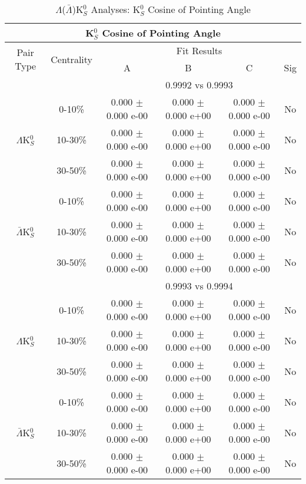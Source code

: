 \documentclass[../AnalysisNoteJBuxton.tex]{subfiles}
\begin{document}
\begin{table}
 \centering
 \begin{tabular}{|c|c|c|c|c|c|}
  \multicolumn{6}{c}{K$^{0}_{S}$ Cosine of Pointing Angle} \\
  \hline
  \multirow{2}{*}{Pair Type} & \multirow{2}{*}{Centrality} & \multicolumn{4}{c|}{Fit Results} \\
  \cline{3-6}
   & & A & B & C & Sig \\  
  \hline
  \multicolumn{2}{|c}{} & \multicolumn{4}{c|}{0.9992 vs 0.9993} \\  
  \hline  
  \multirow{3}{*}{$\Lambda$K$^{0}_{S}$}
   &  0-10\% & 0.000 $\pm$ 0.000 e-00 & 0.000 $\pm$ 0.000 e+00 & 0.000 $\pm$ 0.000 e-00 & No \\
   & 10-30\% & 0.000 $\pm$ 0.000 e-00 & 0.000 $\pm$ 0.000 e+00 & 0.000 $\pm$ 0.000 e-00 & No \\
   & 30-50\% & 0.000 $\pm$ 0.000 e-00 & 0.000 $\pm$ 0.000 e+00 & 0.000 $\pm$ 0.000 e-00 & No \\
  \hline
  \multirow{3}{*}{$\bar{\Lambda}$K$^{0}_{S}$}  
   &  0-10\% & 0.000 $\pm$ 0.000 e-00 & 0.000 $\pm$ 0.000 e+00 & 0.000 $\pm$ 0.000 e-00 & No \\
   & 10-30\% & 0.000 $\pm$ 0.000 e-00 & 0.000 $\pm$ 0.000 e+00 & 0.000 $\pm$ 0.000 e-00 & No \\
   & 30-50\% & 0.000 $\pm$ 0.000 e-00 & 0.000 $\pm$ 0.000 e+00 & 0.000 $\pm$ 0.000 e-00 & No \\
  \hline 
  \multicolumn{2}{|c}{} & \multicolumn{4}{c|}{0.9993 vs 0.9994} \\
  \hline  
  \multirow{3}{*}{$\Lambda$K$^{0}_{S}$}   
   &  0-10\% & 0.000 $\pm$ 0.000 e-00 & 0.000 $\pm$ 0.000 e+00 & 0.000 $\pm$ 0.000 e-00 & No \\
   & 10-30\% & 0.000 $\pm$ 0.000 e-00 & 0.000 $\pm$ 0.000 e+00 & 0.000 $\pm$ 0.000 e-00 & No \\
   & 30-50\% & 0.000 $\pm$ 0.000 e-00 & 0.000 $\pm$ 0.000 e+00 & 0.000 $\pm$ 0.000 e-00 & No \\
  \hline  
  \multirow{3}{*}{$\bar{\Lambda}$K$^{0}_{S}$}
   &  0-10\% & 0.000 $\pm$ 0.000 e-00 & 0.000 $\pm$ 0.000 e+00 & 0.000 $\pm$ 0.000 e-00 & No \\
   & 10-30\% & 0.000 $\pm$ 0.000 e-00 & 0.000 $\pm$ 0.000 e+00 & 0.000 $\pm$ 0.000 e-00 & No \\
   & 30-50\% & 0.000 $\pm$ 0.000 e-00 & 0.000 $\pm$ 0.000 e+00 & 0.000 $\pm$ 0.000 e-00 & No \\
  \hline
 \end{tabular}
 \caption{$\Lambda$($\bar{\Lambda}$)K$^{0}_{S}$ Analyses: K$^{0}_{S}$ Cosine of Pointing Angle}
 \label{tab:K0CosPointingAngleLamK0Full}
\end{table}
\end{document}
